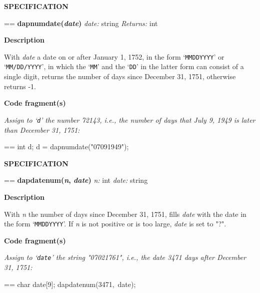 \documentclass{book}
\makeatletter
\newcommand\Texinfocommandstyletextvar[1]{{\normalfont{}\textsl{#1}}}%
\newenvironment{Texinfopreformatted}{%
  \par\GNUTobeylines\obeyspaces\frenchspacing\parskip=\z@\parindent=\z@}{}
{\catcode`\^^M=13 \gdef\GNUTobeylines{\catcode`\^^M=13 \def^^M{\null\par}}}
\newenvironment{Texinfoindented}{\begin{list}{}{}\item\relax}{\end{list}}
\renewcommand{\_}{\Texinfounderscore\discretionary{}{}{}}
\makeatother
\begin{document}
\noindent{}\textbf{SPECIFICATION}
\begin{Texinfoindented}
\begin{Texinfopreformatted}%
\textbf{dap\_numdate(\Texinfocommandstyletextvar{date})}
\Texinfocommandstyletextvar{date:} string
\Texinfocommandstyletextvar{Returns:} int
\end{Texinfopreformatted}
\end{Texinfoindented}
%

\noindent{}\textbf{Description}

With \Texinfocommandstyletextvar{date} a date on or after January 1, 1752,
in the form `\texttt{MMDDYYYY}' or `\texttt{MM/DD/YYYY}',
in which the `\texttt{MM}' and the `\texttt{DD}' in the latter form can consist
of a single digit,
returns the number of days since December 31, 1751, otherwise
returns -1.

\noindent{}\textbf{Code fragment(s)}

\emph{Assign to `\texttt{d}' the number 72143,
i.e., the number of days that
July 9, 1949 is later than December 31, 1751:}
\begin{Texinfoindented}
\begin{Texinfopreformatted}%
\ttfamily int d;
d = dap\_numdate("07091949");
\end{Texinfopreformatted}
\end{Texinfoindented}

\noindent{}\textbf{SPECIFICATION}
\begin{Texinfoindented}
\begin{Texinfopreformatted}%
\textbf{dap\_datenum(\Texinfocommandstyletextvar{n}, \Texinfocommandstyletextvar{date})}
\Texinfocommandstyletextvar{n:} int
\Texinfocommandstyletextvar{date:} string
\end{Texinfopreformatted}
\end{Texinfoindented}
%

\noindent{}\textbf{Description}

With \Texinfocommandstyletextvar{n} the number of days since December 31, 1751,
fills \Texinfocommandstyletextvar{date} with the date in the form `\texttt{MMDDYYYY}'.
If \Texinfocommandstyletextvar{n} is not positive or is too large, \Texinfocommandstyletextvar{date} is
set to "?".

\noindent{}\textbf{Code fragment(s)}

\emph{Assign to `\texttt{date}' the string "07021761",
i.e., the date 3471 days after December 31, 1751:}
\begin{Texinfoindented}
\begin{Texinfopreformatted}%
\ttfamily char date[9];
dap\_datenum(3471,\ date);
\end{Texinfopreformatted}
\end{Texinfoindented}
\end{document}
